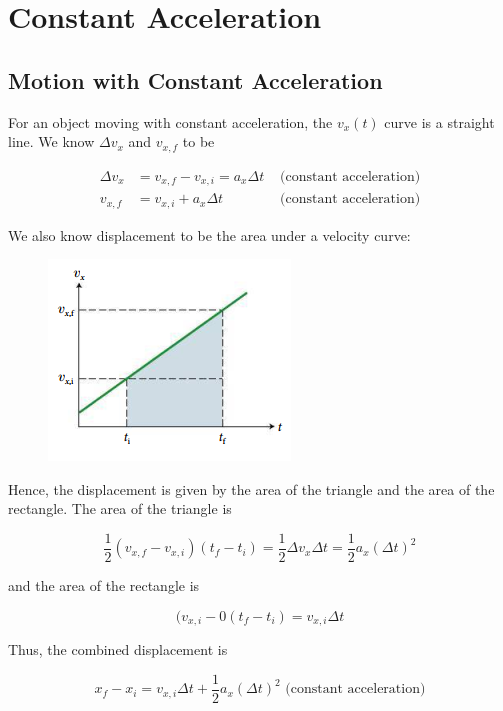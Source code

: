 \section{Constant Acceleration}

    \subsection{Motion with Constant Acceleration}
        For an object moving with constant acceleration, the $v_x (t)$ curve is a straight line. We know $\Delta v_x$ and $v_{x,f}$ to be

        \begin{align*}
            \Delta v_x  &= v_{x,f}-v_{x,i} = a_x \Delta t & \text{ (constant acceleration)} \\
            v_{x,f}     &= v_{x,i} + a_x \Delta t         & \text{ (constant acceleration)}
        \end{align*}

        We also know displacement to be the area under a velocity curve:

        \begin{figure}[hbt!]
            \centering
            \includegraphics[scale=0.8]{Resources/Constant_Acceleration}
        \end{figure}

        Hence, the displacement is given by the area of the triangle and the area of the rectangle. The area of the triangle is

        \[
            \frac{1}{2}(v_{x,f}-v_{x,i})(t_f-t_i)=\frac{1}{2}\Delta v_x \Delta t = \frac{1}{2} a_x(\Delta t)^2
        \]

        and the area of the rectangle is

        \[
            (v_{x,i}-0(t_f-t_i)=v_{x,i}\Delta t
        \]

        Thus, the combined displacement is

        \[
            x_f - x_i = v_{x,i} \Delta t + \frac{1}{2} a_x (\Delta t)^2 \text{ (constant acceleration)}
        \]

